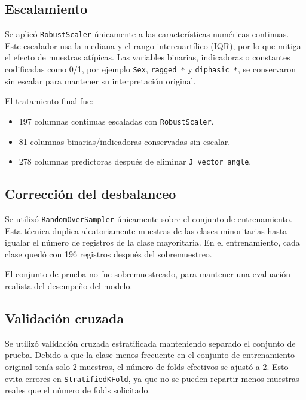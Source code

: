 \documentclass{article}
\begin{document}
\subsection{Escalamiento}

Se aplicó \texttt{RobustScaler} únicamente a las características numéricas continuas. Este escalador usa la mediana y el rango intercuartílico (IQR), por lo que mitiga el efecto de muestras atípicas. Las variables binarias, indicadoras o constantes codificadas como 0/1, por ejemplo \texttt{Sex}, \texttt{ragged\_*} y \texttt{diphasic\_*}, se conservaron sin escalar para mantener su interpretación original.

El tratamiento final fue:

\begin{itemize}
    \item 197 columnas continuas escaladas con \texttt{RobustScaler}.
    \item 81 columnas binarias/indicadoras conservadas sin escalar.
    \item 278 columnas predictoras después de eliminar \texttt{J\_vector\_angle}.
\end{itemize}

\subsection{Corrección del desbalanceo}

Se utilizó \texttt{RandomOverSampler} únicamente sobre el conjunto de entrenamiento. Esta técnica duplica aleatoriamente muestras de las clases minoritarias hasta igualar el número de registros de la clase mayoritaria. En el entrenamiento, cada clase quedó con 196 registros después del sobremuestreo.

El conjunto de prueba no fue sobremuestreado, para mantener una evaluación realista del desempeño del modelo.

\subsection{Validación cruzada}

Se utilizó validación cruzada estratificada manteniendo separado el conjunto de prueba. Debido a que la clase menos frecuente en el conjunto de entrenamiento original tenía solo 2 muestras, el número de folds efectivos se ajustó a 2. Esto evita errores en \texttt{StratifiedKFold}, ya que no se pueden repartir menos muestras reales que el número de folds solicitado.
\end{document}
